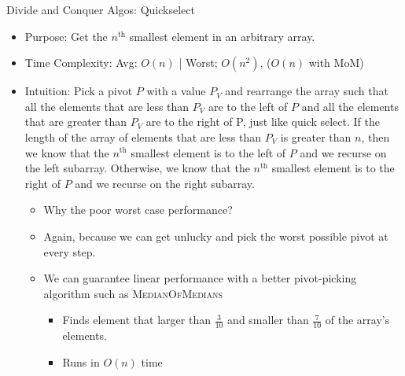 \documentclass{beamer}
\begin{document}
\begin{frame}[t]{Divide and Conquer Algos: Quickselect}
    \begin{itemize}
        \item \alert{Purpose:} Get the $n^\text{th}$ smallest element in an arbitrary array.
        \item \alert{Time Complexity}: Avg: $O(n)$ | Worst; $O(n^2)$, ($O(n)$ with MoM)
        \item \alert{Intuition}: Pick a pivot $P$ with a value $P_V$ and rearrange the array such that all the elements that are less than $P_V$ are to the left of $P$ and all the elements that are greater than $P_V$ are to the right of P, just like quick select. If the length of the array of elements that are less than $P_V$ is greater than $n$, then we know that the $n^\text{th}$ smallest element is to the left of $P$ and we recurse on the left subarray. Otherwise, we know that the $n^\text{th}$ smallest element is to the right of $P$ and we recurse on the right subarray.
        \begin{itemize}
            \item \alert{Why the poor worst case performance?}
            \item Again, because we can get unlucky and pick the worst possible pivot at every step.
            \item We can guarantee linear performance with a better pivot-picking algorithm such as \textsc{MedianOfMedians}
            \begin{itemize}
                \item Finds element that larger than $\frac{3}{10}$ and smaller than $\frac{7}{10}$ of the array's elements.
                \item Runs in $O(n)$ time
            \end{itemize}
        \end{itemize}
    \end{itemize}
\end{frame}
\end{document}

